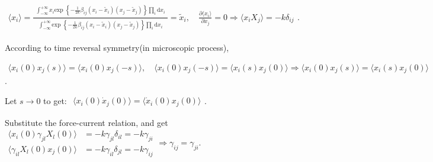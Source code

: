 \documentclass[../../main.tex]{subfiles}
\begin{document}
  $\begin{aligned}
    \langle x_{i}\rangle = \frac{\begin{aligned}
      \int_{-\infty}^{+\infty}x_{i}\text{exp }\left\{-\frac{1}{2k}\beta_{ij}\left(x_{i}-\widetilde{x}_{i}\right)\left(x_{j}-\widetilde{x}_{j}\right)\right\}\prod_{i}\mathrm{d}x_{i}
    \end{aligned}}{\begin{aligned}
      \int_{-\infty}^{+\infty}\text{exp }\left\{-\frac{1}{2k}\beta_{ij}\left(x_{i}-\widetilde{x}_{i}\right)\left(x_{j}-\widetilde{x}_{j}\right)\right\}\prod_{i}\mathrm{d}x_{i}
    \end{aligned}} = \widetilde{x}_{i},\quad \frac{\partial\langle x_{i}\rangle}{\partial x_{j}} = 0\Rightarrow \langle x_{i}X_{j}\rangle = -k\delta_{ij}
  \end{aligned}$. 

  According to time reversal symmetry(in microscopic process), 
  
  $\begin{aligned}
    \langle x_{i}(0)x_{j}(s)\rangle = \langle x_{i}(0)x_{j}(-s)\rangle,\quad \langle x_{i}(0)x_{j}(-s)\rangle = \langle x_{i}(s)x_{j}(0)\rangle\Rightarrow \langle x_{i}(0)x_{j}(s)\rangle = \langle x_{i}(s)x_{j}(0)\rangle
  \end{aligned}$. 
  
  Let $s\rightarrow 0$ to get: $\begin{aligned}
    \langle x_{i}(0)\dot{x}_{j}(0)\rangle = \langle \dot{x}_{i}(0)x_{j}(0)\rangle
  \end{aligned}$. 
  
  Substitute the force-current relation, and get $\begin{aligned}
    \langle x_{i}(0)\gamma_{jl}X_{l}(0)\rangle &= -k\gamma_{jl}\delta_{il} = -k\gamma_{ji}\\
    \langle \gamma_{il}X_{l}(0)x_{j}(0)\rangle &= -k\gamma_{il}\delta_{jl} = -k\gamma_{ij}
  \end{aligned}\Rightarrow \boxed{\gamma_{ij} = \gamma_{ji}}$.
\end{document}
